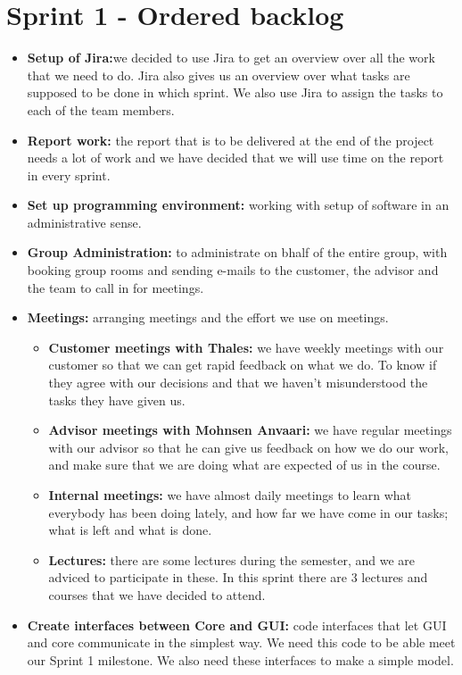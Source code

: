 \section{Sprint 1 - Ordered backlog}

\begin{itemize}
\item{}\textbf{Setup of Jira:}we decided to use Jira to get an overview over all the work that we need to do. Jira also gives us an overview over what tasks are supposed to be done in which sprint. We also use Jira to assign the tasks to each of the team members.
\item{}\textbf{Report work:} the report that is to be delivered at the end of the project needs a lot of work and we have decided that we will use time on the report in every sprint.
\item{}\textbf{Set up programming environment:} working with setup of software in an administrative sense.
\item{}\textbf{Group Administration:} to administrate on bhalf of the entire group, with booking group rooms and sending e-mails to the customer, the advisor and the team to call in for meetings.
\item{}\textbf{Meetings:} arranging meetings and the effort we use on meetings.
\begin{itemize}
\item{}\textbf{Customer meetings with Thales:} we have weekly meetings with our customer so that we can get rapid feedback on what we do. To know if they agree with our decisions and that we haven’t misunderstood the tasks they have given us.
\item{}\textbf{Advisor meetings with Mohnsen Anvaari:} we have regular meetings with our advisor so that he can give us feedback on how we do our work, and make sure that we are doing what are expected of us in the course.
\item{}\textbf{Internal meetings:} we have almost daily meetings to learn what everybody has been doing lately, and how far we have come in our tasks; what is left and what is done.
\item{}\textbf{Lectures:} there are some lectures during the semester, and we are adviced to participate in these. In this sprint there are 3 lectures and courses that we have decided to attend.
\end{itemize}
\item{}\textbf{Create interfaces between Core and GUI:} code interfaces that let GUI and core communicate in the simplest way. We need this code to be able meet our Sprint 1 milestone. We also need these interfaces to make a simple model.

\end{itemize}
